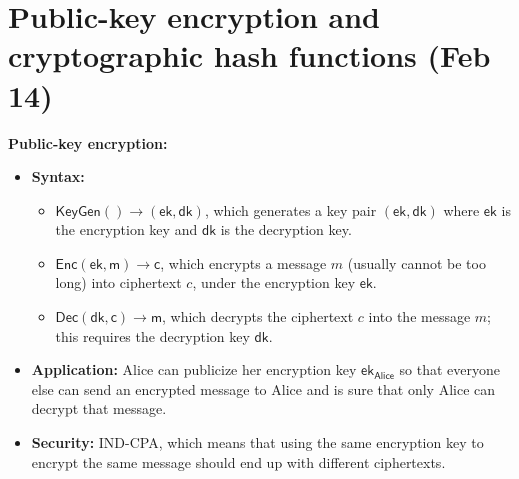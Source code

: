 \documentclass{article}
\newcommand{\msf}[1]{\mathsf{#1}}
\newcommand{\parhead}[1]{\noindent \textbf{#1}}
\begin{document}
\newpage
\section{Public-key encryption and cryptographic hash functions (Feb 14)}
\parhead{Public-key encryption:}
\begin{itemize}
    \item {\bf Syntax:}
    \begin{itemize}
        \item $\msf{KeyGen}()\rightarrow(\msf{ek},\msf{dk})$, which generates a key pair $(\msf{ek},\msf{dk})$ where $\msf{ek}$ is the encryption key and $\msf{dk}$ is the decryption key.
        
        \item $\msf{Enc}(\msf{ek},\msf{m})\rightarrow \msf{c}$, which encrypts a message $m$ (usually cannot be too long) into ciphertext $c$, under the encryption key $\msf{ek}$.
        
        \item $\msf{Dec}(\msf{dk},\msf{c})\rightarrow\msf{m}$, which decrypts the ciphertext $c$ into the message $m$; this requires the decryption key $\msf{dk}$.
    \end{itemize}
    
    \item {\bf Application:} Alice can publicize her encryption key $\msf{ek}_\msf{Alice}$ so that everyone else can send an encrypted message to Alice and is sure that only Alice can decrypt that message.
    
    \item {\bf Security:} IND-CPA, which means that using the same encryption key to encrypt the same message should end up with different ciphertexts.
\end{itemize}
\end{document}
